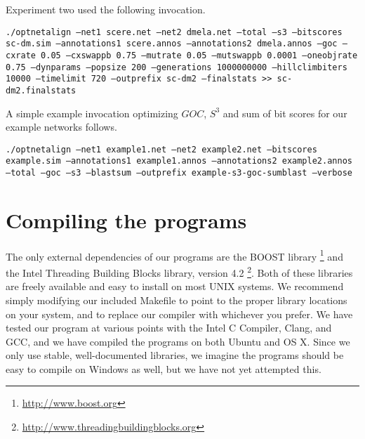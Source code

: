 \documentclass[11pt]{article} %
\begin{document}
Experiment two used the following invocation.

\texttt{./optnetalign --net1 scere.net --net2 dmela.net --total --s3 --bitscores sc-dm.sim --annotations1 scere.annos --annotations2 dmela.annos --goc --cxrate 0.05 --cxswappb 0.75 --mutrate 0.05 --mutswappb 0.0001 --oneobjrate 0.75 --dynparams --popsize 200 --generations 1000000000 --hillclimbiters 10000  --timelimit 720 --outprefix sc-dm2 --finalstats >> sc-dm2.finalstats}

A simple example invocation optimizing \(GOC\), \(S^3\) and sum of bit scores for our example networks follows.

\texttt{./optnetalign --net1 example1.net --net2 example2.net --bitscores example.sim --annotations1 example1.annos --annotations2 example2.annos --total --goc --s3 --blastsum --outprefix example-s3-goc-sumblast --verbose}

\section{Compiling the programs}
The only external dependencies of our programs are the BOOST library \footnote{\url{http://www.boost.org}} and the Intel Threading Building Blocks library, version 4.2 \footnote{\url{http://www.threadingbuildingblocks.org}}. Both of these libraries are freely available and easy to install on most UNIX systems. We recommend simply modifying our included Makefile to point to the proper library locations on your system, and to replace our compiler with whichever you prefer. We have tested our program at various points with the Intel C Compiler, Clang, and GCC, and we have compiled the programs on both Ubuntu and OS X. Since we only use stable, well-documented libraries, we imagine the programs should be easy to compile on Windows as well, but we have not yet attempted this. 
\end{document}
